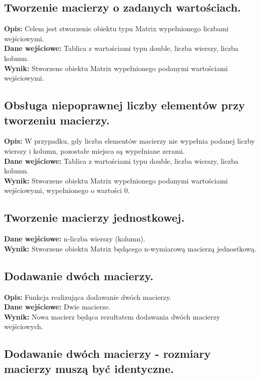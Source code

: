 \documentclass[a4paper,12pt,twoside]{article}
\begin{document}
\subsection{Tworzenie macierzy o zadanych wartościach.}

\textbf{Opis:} Celem jest stworzenie obiektu typu Matrix wypełnionego liczbami wejściowymi.\\
\textbf{Dane wejściowe:} Tablica z wartościami typu double, liczba wierszy, liczba kolumn.\\
\textbf{Wynik:} Stworzene obiektu Matrix wypełnionego podanymi wartościami wejściowymi.

\subsection{Obsługa niepoprawnej liczby elementów przy tworzeniu macierzy.}

\textbf{Opis:} W przypadku, gdy liczba elementów macierzy nie wypełnia podanej liczby wierszy
i kolumn, pozostałe miejsca są wypełniane zerami.\\
\textbf{Dane wejściowe:} Tablica z wartościami typu double, liczba wierszy, liczba kolumn.\\
\textbf{Wynik:} Stworzene obiektu Matrix wypełnionego podanymi wartościami wejściowymi, wypełnionego
o wartości 0.

\subsection{Tworzenie macierzy jednostkowej.}

\textbf{Dane wejściowe:} n-liczba wierszy (kolumn).\\
\textbf{Wynik:} Stworzene obiektu Matrix będącego n-wymiarową macierzą jednostkową.

\subsection{Dodawanie dwóch macierzy.}

\textbf{Opis:} Funkcja realizująca dodawanie dwóch macierzy.\\
\textbf{Dane wejściowe:} Dwie macierze.\\
\textbf{Wynik:} Nowa macierz będąca rezultatem dodawania dwóch macierzy wejściowych.

\subsection{Dodawanie dwóch macierzy - rozmiary macierzy muszą być identyczne.}
\end{document}
